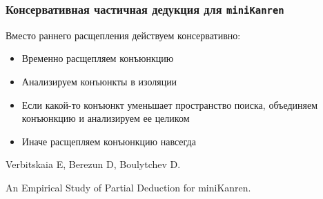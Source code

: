 \documentclass{beamer}
\newcommand{\miniKanren}{\texttt{miniKanren}\xspace}
\begin{document}
\begin{frame}[fragile]
  \frametitle{Консервативная частичная дедукция для \miniKanren}
\begin{center}
  Вместо раннего расщепления действуем консервативно:
\end{center}

\begin{itemize}
  \item Временно расщепляем конъюнкцию
  \item Анализируем конъюнкты в изоляции
  \item Если какой-то конъюнкт уменьшает пространство поиска, объединяем конъюнкцию и анализируем ее целиком
  \item Иначе расщепляем конъюнкцию навсегда
\end{itemize}

\vfill

\begin{center}
  Verbitskaia E, Berezun D, Boulytchev D.

  An Empirical Study of Partial Deduction for miniKanren.
\end{center}

\end{frame}
\end{document}

